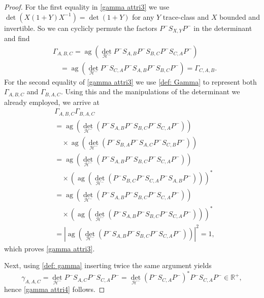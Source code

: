\documentclass[b5paper,draft,openbib,12pt]{memoir}
\DeclareMathOperator{\ag}{ag}
\begin{document}
\begin{proof}
For the first equality in \eqref{gamma attri3} we use \(\det (X (1+Y) X^{-1})=\det (1+Y)\) for any \(Y\) trace-class and 
 \(X\) bounded and invertible. So we can cyclicly permute the factors \(P^- S_{X,Y}P^-\) in the determinant and find
\begin{align*}
&\Gamma_{A,B,C}=\ag(\det_{\mathcal{H}^-} P^- S_{A,B}P^-S_{B,C}P^-S_{C,A}P^- )\\
&\quad=\ag(\det_{\mathcal{H}^-} P^-S_{C,A}P^- S_{A,B}P^-S_{B,C}P^- )
=\Gamma_{C,A,B}.
\end{align*}
For the second equality of \eqref{gamma attri3} we use \eqref{def: Gamma}
to represent both \(\Gamma_{A,B,C}\) and \(\Gamma_{B,A,C}\). Using this and the manipulations of the determinant 
we already employed, we arrive at
\begin{align}
&\Gamma_{A,B,C}\Gamma_{B,A,C}\\
&=\ag(\det_{\mathcal{H}^-} (P^-S_{A,B}P^-S_{B,C}P^-S_{C,A}P^-))\\
&\quad\times\ag(\det_{\mathcal{H}^-} (P^-S_{B,A}P^-S_{A,C}P^-S_{C,B}P^-))\\
&=\ag(\det_{\mathcal{H}^-} (P^-S_{A,B}P^-S_{B,C}P^-S_{C,A}P^-))\\
&\quad\times(\ag(\det_{\mathcal{H}^-} (P^-S_{B,C}P^-S_{C,A}P^-S_{A,B}P^-)))^*\\
&=\ag(\det_{\mathcal{H}^-} (P^-S_{A,B}P^-S_{B,C}P^-S_{C,A}P^-))\\
&\quad\times(\ag(\det_{\mathcal{H}^-} (P^-S_{A,B}P^-S_{B,C}P^-S_{C,A}P^-)))^*\\
&=|\ag(\det_{\mathcal{H}^-} (P^-S_{A,B}P^-S_{B,C}P^-S_{C,A}P^-))|^2=1,
\end{align}
which proves \eqref{gamma attri3}. 

Next, using \eqref{def: gamma} inserting twice the same argument yields
\begin{equation}
\gamma_{A,A,C}=\det_{\mathcal{H}^-} P^-S_{A,C}P^-S_{C,A}P^-
=\det_{\mathcal{H}^-} (P^- S_{C,A} P^-)^*P^-S_{C,A}P^-\in \mathbb{R}^+,
\end{equation}
hence \eqref{gamma attri4} follows.



\end{proof}
\end{document}
